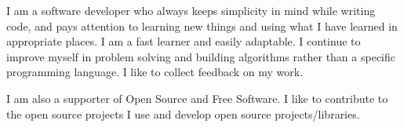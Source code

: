 
\begin{cvparagraph}
I am a software developer who always keeps simplicity in mind while writing code,
and pays attention to learning new things and using what I have learned in
appropriate places. I am a fast learner and easily adaptable. I continue to
improve myself in problem solving and building algorithms rather than a specific
programming language. I like to collect feedback on my work.

I am also a supporter of Open Source and Free Software. I like to contribute to
the open source projects I use and develop open source projects/libraries.
\end{cvparagraph}
